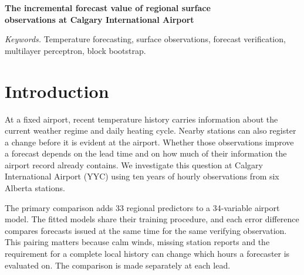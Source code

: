 \documentclass[11pt,letterpaper]{article}
\newcommand{\celsius}{\ensuremath{^{\circ}\mathrm{C}}}\newcommand{\code}[1]{\texttt{\small #1}}
\begin{document}
\begin{center}
{\Large\bfseries The incremental forecast value of regional surface\\[2pt] observations at Calgary International Airport\par}
\end{center}
\begin{abstract}
We estimate the incremental value of five neighbouring surface stations for forecasts of hourly air temperature at Calgary International Airport. Airport-only and regional multilayer perceptrons are fitted by the same procedure at leads of 1, 6, 12, 24 and 48 hours. Models are trained on 2016--2023 observations, selected on 2024, and scored at 8,102 matched origins in 2025. At six hours, regional inputs reduce root mean squared error from 2.676 to 2.328\,\celsius{}, a 13.02\% reduction (pointwise 95\% paired seven-day block interval, 10.29--15.78\%). The number of errors of at least 5\,\celsius{} in absolute value falls from 496 to 326. Winter accounts for half the decrease in total squared error. Relative gains are positive through 24 hours. At 48 hours the estimated reduction is $-0.55\%$ (interval $-2.85$ to $1.47\%$). These estimates quantify the contribution of archived regional observations for one target site and test year.
\end{abstract}
\noindent\textit{Keywords.} Temperature forecasting, surface observations, forecast verification, multilayer perceptron, block bootstrap.

\section{Introduction}
At a fixed airport, recent temperature history carries information about the current weather regime and daily heating cycle. Nearby stations can also register a change before it is evident at the airport. Whether those observations improve a forecast depends on the lead time and on how much of their information the airport record already contains. We investigate this question at Calgary International Airport (YYC) using ten years of hourly observations from six Alberta stations.

The primary comparison adds 33 regional predictors to a 34-variable airport model. The fitted models share their training procedure, and each error difference compares forecasts issued at the same time for the same verifying observation. This pairing matters because calm winds, missing station reports and the requirement for a complete local history can change which hours a forecaster is evaluated on. The comparison is made separately at each lead.
\end{document}
